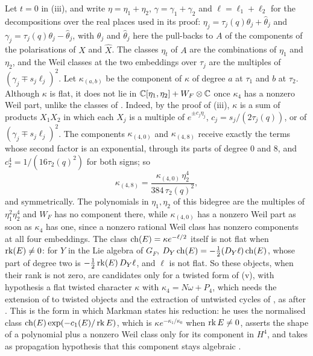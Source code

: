 \begin{remark}\label{rem:quarticsecantshape}
Let $t=0$ in (iii), and write
$\eta=\eta_{1}+\eta_{2}$, $\gamma=\gamma_{1}+\gamma_{2}$ and
$\ell=\ell_{1}+\ell_{2}$ for the decompositions over the real places used in
its proof: $\eta_{j}=\tau_{j}(q)\theta_{j}+\widehat\theta_{j}$ and
$\gamma_{j}=\tau_{j}(q)\theta_{j}-\widehat\theta_{j}$, with $\theta_{j}$ and
$\widehat\theta_{j}$ here the pull-backs to $A$ of the components of the
polarisations of $X$ and $\widehat X$. The classes $\eta_{t}$ of $A$ are the
combinations of $\eta_{1}$ and $\eta_{2}$, and the Weil classes at the two
embeddings over $\tau_{j}$ are the multiples of
$(\gamma_{j}\mp s_{j}\ell_{j})^{2}$. Let $\kappa_{(a,b)}$ be the component of
$\kappa$ of degree $a$ at $\tau_{1}$ and $b$ at $\tau_{2}$. Although $\kappa$
is flat, it does not lie in $\mathbb{C}[\eta_{1},\eta_{2}]+W_{F}\otimes\mathbb{C}$ once
$\kappa_{4}$ has a nonzero Weil part, unlike the classes of
. Indeed, by the proof of (iii),
$\kappa$ is a sum of products $X_{1}X_{2}$ in which each $X_{j}$ is a multiple
of $e^{\pm c_{j}\eta_{j}}$, $c_{j}=s_{j}/(2\tau_{j}(q))$, or of
$(\gamma_{j}\mp s_{j}\ell_{j})^{2}$. The components $\kappa_{(4,0)}$ and
$\kappa_{(4,8)}$ receive exactly the terms whose second factor is an
exponential, through its parts of degree $0$ and $8$, and
$c_{2}^{4}=1/(16\tau_{2}(q)^{2})$ for both signs; so
\[
  \kappa_{(4,8)}=\frac{\kappa_{(4,0)}\,\eta_{2}^{4}}{384\,\tau_{2}(q)^{2}},
\]
and symmetrically. The polynomials in $\eta_{1},\eta_{2}$ of this bidegree
are the multiples of $\eta_{1}^{2}\eta_{2}^{4}$ and $W_{F}$ has no component
there, while $\kappa_{(4,0)}$ has a nonzero Weil part as soon as $\kappa_{4}$
has one, since a nonzero rational Weil class has nonzero components at all
four embeddings. The class $\operatorname{ch}(E)=\kappa e^{-\ell/2}$ itself is not flat
when $\operatorname{rk}(E)\ne0$: for $Y$ in the Lie algebra of $G_{F}$,
$D_{Y}\operatorname{ch}(E)=-\tfrac12(D_{Y}\ell)\operatorname{ch}(E)$, whose part of degree two is
$-\tfrac12\operatorname{rk}(E)\,D_{Y}\ell$, and $\ell$ is not flat. So these objects, when
their rank is not zero, are candidates only for a twisted form of (v), with
hypothesis a flat twisted character $\kappa$ with $\kappa_{4}=N\omega+P_{4}$,
which needs the extension of  to twisted objects \cite{Per26}
and the extraction of untwisted cycles of \cite[Section~2]{Mar25b}, as after
. This is the form in which Markman states his
reduction: he uses the normalised class $\operatorname{ch}(E)\exp(-c_{1}(E)/\operatorname{rk} E)$, which is
$\kappa e^{-\kappa_{1}/\kappa_{0}}$ when $\operatorname{rk} E\ne0$, asserts the shape of a
polynomial plus a nonzero Weil class only for its component in $H^{4}$, and
takes as propagation hypothesis that this component stays algebraic
\cite[Proposition~10.2.1, Corollary~10.2.3]{Mar25c}.
\end{remark}

